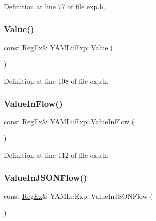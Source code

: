 Definition at line 77 of file exp.\+h.

\mbox{\label{namespace_y_a_m_l_1_1_exp_a0c7f4cf978b1284708daaa8c1aafc037}} 
\subsubsection{\texorpdfstring{Value()}{Value()}}
{\footnotesize\ttfamily const \mbox{\hyperlink{class_y_a_m_l_1_1_reg_ex}{Reg\+Ex}}\& Y\+A\+M\+L\+::\+Exp\+::\+Value (\begin{DoxyParamCaption}{ }\end{DoxyParamCaption})\hspace{0.3cm}{\ttfamily [inline]}}



Definition at line 108 of file exp.\+h.

\mbox{\label{namespace_y_a_m_l_1_1_exp_a95383376a158979a55d80a8ed734539f}} 
\subsubsection{\texorpdfstring{ValueInFlow()}{ValueInFlow()}}
{\footnotesize\ttfamily const \mbox{\hyperlink{class_y_a_m_l_1_1_reg_ex}{Reg\+Ex}}\& Y\+A\+M\+L\+::\+Exp\+::\+Value\+In\+Flow (\begin{DoxyParamCaption}{ }\end{DoxyParamCaption})\hspace{0.3cm}{\ttfamily [inline]}}



Definition at line 112 of file exp.\+h.

\mbox{\label{namespace_y_a_m_l_1_1_exp_a9dfedb0d45b64fffb7645638dfafc217}} 
\subsubsection{\texorpdfstring{ValueInJSONFlow()}{ValueInJSONFlow()}}
{\footnotesize\ttfamily const \mbox{\hyperlink{class_y_a_m_l_1_1_reg_ex}{Reg\+Ex}}\& Y\+A\+M\+L\+::\+Exp\+::\+Value\+In\+J\+S\+O\+N\+Flow (\begin{DoxyParamCaption}{ }\end{DoxyParamCaption})\hspace{0.3cm}{\ttfamily [inline]}}



